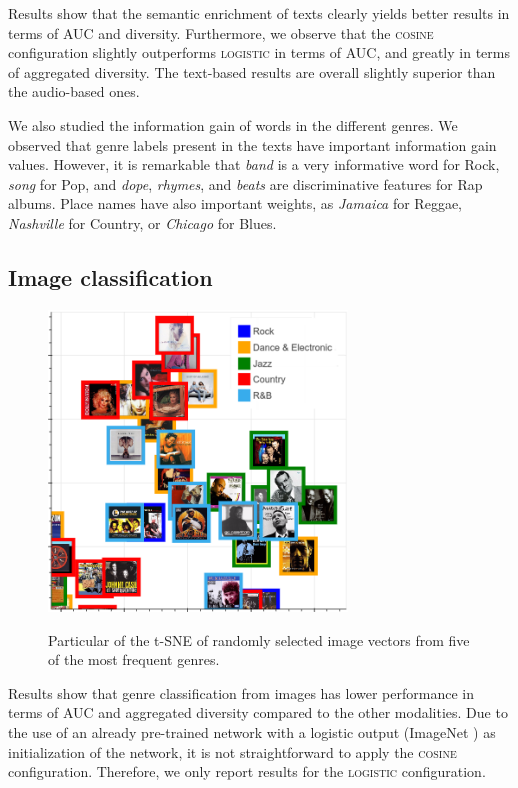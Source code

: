 Results show that the semantic enrichment of texts clearly yields better results in terms of AUC and diversity.
Furthermore, we observe that the \textsc{cosine} configuration slightly outperforms \textsc{logistic} in terms of AUC, and greatly in terms of aggregated diversity. 
The text-based results are overall slightly superior than the audio-based ones. 

We also studied the information gain of words in the different genres. We observed that genre labels present in the texts have important information gain values. However, it is remarkable that \textit{band} is a very informative word for Rock, \textit{song} for Pop, and \textit{dope}, \textit{rhymes}, and \textit{beats} are discriminative features for Rap albums. Place names have also important weights, as \textit{Jamaica} for Reggae, \textit{Nashville} for Country, or \textit{Chicago} for Blues.%


\subsection{Image classification}\label{sec:multi-class:imageexp}


\begin{figure}
\centering
\includegraphics[height=8cm,keepaspectratio]{ch09_multi-class_pics/visual_zoom2.png} \\ 
\caption{Particular of the t-SNE of randomly selected image vectors from five of the most frequent genres.}
\label{fig:tsne_visual}
\end{figure}

Results show that genre classification from images has lower performance in terms of AUC and aggregated diversity compared to the other modalities. Due to the use of an already pre-trained network with a logistic output (ImageNet \cite{ILSVRC15}) as initialization of the network, it is not straightforward to apply the \textsc{cosine} configuration. Therefore, we only report results for the \textsc{logistic} configuration.


